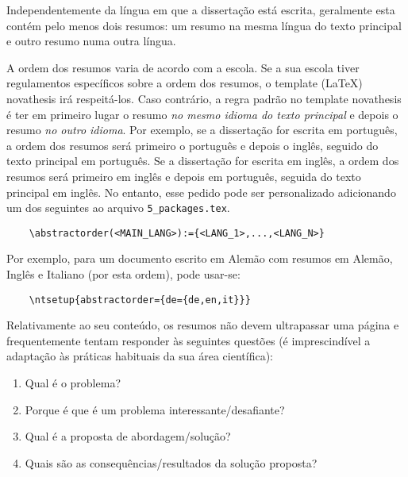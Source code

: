 
%

Independentemente da língua em que a dissertação está escrita, geralmente esta contém pelo menos dois resumos: um resumo na mesma língua do texto principal e outro resumo numa outra língua.

A ordem dos resumos varia de acordo com a escola. Se a sua escola tiver regulamentos específicos sobre a ordem dos resumos, o template (\LaTeX) \gls{novathesis} irá respeitá-los. Caso contrário, a regra padrão no template \gls{novathesis} é ter em primeiro lugar o resumo \emph{no mesmo idioma do texto principal} e depois o resumo \emph{no outro idioma}. Por exemplo, se a dissertação for escrita em português, a ordem dos resumos será primeiro o português e depois o inglês, seguido do texto principal em português. Se a dissertação for escrita em inglês, a ordem dos resumos será primeiro em inglês e depois em português, seguida do texto principal em inglês.
%
No entanto, esse pedido pode ser personalizado adicionando um dos seguintes ao arquivo \verb+5_packages.tex+.

\begin{verbatim}
    \abstractorder(<MAIN_LANG>):={<LANG_1>,...,<LANG_N>}
\end{verbatim}

Por exemplo, para um documento escrito em Alemão com resumos em Alemão, Inglês e Italiano (por esta ordem), pode usar-se:
\begin{verbatim}
    \ntsetup{abstractorder={de={de,en,it}}}
\end{verbatim}

Relativamente ao seu conteúdo, os resumos não devem ultrapassar uma página e frequentemente tentam responder às seguintes questões (é imprescindível a adaptação às práticas habituais da sua área científica):

\begin{enumerate}
  \item Qual é o problema?
  \item Porque é que é um problema interessante/desafiante?
  \item Qual é a proposta de abordagem/solução?
  \item Quais são as consequências/resultados da solução proposta?
\end{enumerate}

